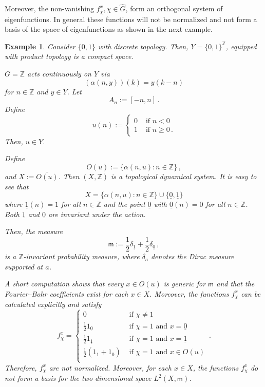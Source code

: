 \documentclass [14pt]{amsart}
\numberwithin{equation}{section}
\newcommand{\ZZ}{{\mathbb Z}}
\newcommand{\mm}{\mathsf{m}}
\newtheorem{example}[theorem]{Example}
\begin{document}
Moreover, the non-vanishing $f_\chi^x, \chi \in \widehat{G}$,  form an orthogonal system of eigenfunctions.  In general these functions will not be normalized and not form a basis of the space of eigenfunctions as shown in the next example.

\smallskip

\begin{example} Consider $\{0,1\}$ with discrete topology. Then,  $Y =\{0,1\}^\ZZ$, equipped with product topology is a compact space.

$G =\ZZ$ acts continuously on $Y$ via
$$(\alpha(n,y)) (k) = y(k-n)$$ for $n\in\ZZ$ and $y\in Y$. Let
\[
A_n:=[-n,n] \,.
\]
Define
\[
u(n) :=
\left\{
\begin{array}{cc}
  0 & \mbox{ if } n < 0 \\
  1 & \mbox{ if } n \geq 0 \,.
\end{array}
\right.
\]
Then, $u \in Y$.

Define
\[
O(u):=  \{\alpha(n,u) : n \in \ZZ \}  \,,
\]
and $X:= \overline{O(u)}$. Then $(X, \ZZ)$ is a topological dynamical system. It is easy to see that
\[
X= \{\alpha(n,u) : n \in \ZZ \} \cup \{ \underline{0}, \underline{1} \}
\]
where $\underline{1}(n) =1$ for all $n\in \ZZ$ and the point  $\underline{0}$ with $\underline{0}(n) =0$ for all $n\in\ZZ$.   Both $\underline{1}$ and $\underline{0}$ are invariant under the action.

Then, the measure
$$\mm :=\frac{1}{2} \delta_{\underline{1}} + \frac{1}{2} \delta_{\underline{0}} \,,$$
is a $\ZZ$-invariant probability measure, where $\delta_a$ denotes the Dirac measure supported at $a$.

A short computation shows that every  $x\in O(u)$ is generic for $\mm$ and that the Fourier--Bohr coefficients exist for each $x\in X$. Moreover, the functions $f_\chi^x$ can be calculated explicitly and satisfy
\[
f_\chi^x=
\left\{
\begin{array}{cc}
 0 & \mbox{ if } \chi \neq 1 \\
 \frac{1}{2} 1_{\underline{0}} & \mbox{ if } \chi =1 \mbox{ and } x=  \underline{0} \\
  \frac{1}{2} 1_{\underline{1}} & \mbox{ if } \chi =1 \mbox{ and } x=  \underline{1} \\
    \frac{1}{2}(1_{\underline{1}} + 1_{\underline{0}}) & \mbox{ if } \chi =1 \mbox{ and } x \in O(u) \\
\end{array}
\right. \,.
\]
Therefore, $f_\chi^x$ are not normalized. Moreover, for each $x \in X$, the functions $f_{\chi}^x$ do not form a basis for the two dimensional space $L^2 (X,\mm)$.
\end{example}
\smallskip
\end{document}

